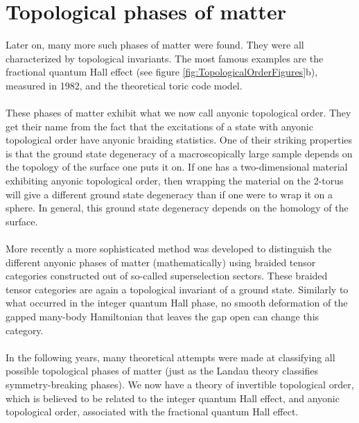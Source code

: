 \section{Topological phases of matter}
Later on, many more such phases of matter were found. They were all characterized by topological invariants. The most famous examples are the fractional quantum Hall effect (see figure \ref{fig:TopologicalOrderFigures}b), measured in 1982, and the theoretical toric code\cite{Kitaev_2003} model.
\\\\
These phases of matter exhibit what we now call anyonic topological order. They get their name from the fact that the excitations of a state with anyonic topological order have anyonic braiding statistics. One of their striking properties is that the ground state degeneracy of a macroscopically large sample depends on the topology of the surface one puts it on. If one has a two-dimensional material exhibiting anyonic topological order, then wrapping the material on the 2-torus will give a different ground state degeneracy than if one were to wrap it on a sphere. In general, this ground state degeneracy depends on the homology of the surface.
\\\\
More recently a more sophisticated method was developed to distinguish the different anyonic phases of matter (mathematically) using braided tensor categories constructed out of so-called superselection sectors. These braided tensor categories are again a topological invariant of a ground state. Similarly to what occurred in the integer quantum Hall phase, no smooth deformation of the gapped many-body Hamiltonian that leaves the gap open can change this category.
\\\\
In the following years, many theoretical attempts were made at classifying all possible topological phases of matter (just as the Landau theory classifies symmetry-breaking phases). We now have a theory of invertible topological order, which is believed to be related to the integer quantum Hall effect, and anyonic topological order, associated with the fractional quantum Hall effect.
